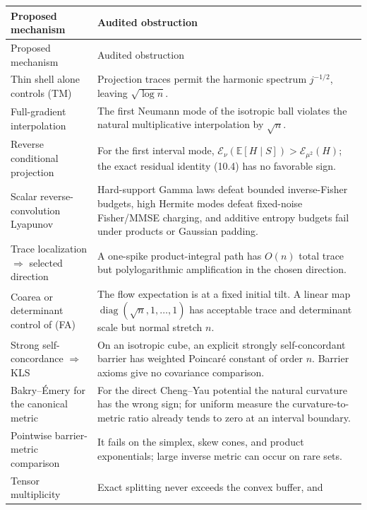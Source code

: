 \documentclass[11pt]{article}
\theoremstyle{definition}
\theoremstyle{remark}
\newcommand{\E}{\mathbb E}
\newcommand{\1}{\mathbf 1}
\begin{document}
\begin{longtable}{>{\raggedright\arraybackslash}p{}
                  >{\raggedright\arraybackslash}p{}}
\toprule
Proposed mechanism & Audited obstruction \\
\midrule
\endfirsthead
\toprule
Proposed mechanism & Audited obstruction \\
\midrule
\endhead
Thin shell alone controls (TM) & Projection traces permit the harmonic
spectrum \(j^{-1/2}\), leaving \(\sqrt{\log n}\). \\
\addlinespace
Full-gradient interpolation & The first Neumann mode of the isotropic ball
violates the natural multiplicative interpolation by \(\sqrt n\). \\
\addlinespace
Reverse conditional projection & For the first interval mode,
\(\mathcal E_\nu(\E[H\mid S])>\mathcal E_{\mu^2}(H)\); the exact residual
identity (10.4) has no favorable sign. \\
\addlinespace
Scalar reverse-convolution Lyapunov & Hard-support Gamma laws defeat
bounded inverse-Fisher budgets, high Hermite modes defeat fixed-noise
Fisher/MMSE charging, and additive entropy budgets fail under products or
Gaussian padding. \\
\addlinespace
Trace localization \(\Rightarrow\) selected direction & A one-spike
product-integral path has \(O(n)\) total trace but polylogarithmic
amplification in the chosen direction. \\
\addlinespace
Coarea or determinant control of (FA) & The flow expectation is at a fixed
initial tilt.  A linear map \(\operatorname{diag}(\sqrt n,1,\ldots,1)\)
has acceptable trace and determinant scale but normal stretch \(n\). \\
\addlinespace
Strong self-concordance \(\Rightarrow\) KLS & On an isotropic cube, an
explicit strongly self-concordant barrier has weighted Poincar\'e constant
of order \(n\).  Barrier axioms give no covariance comparison. \\
\addlinespace
Bakry--\'Emery for the canonical metric & For the direct Cheng--Yau
potential the natural curvature has the wrong sign; for uniform measure
the curvature-to-metric ratio already tends to zero at an interval
boundary. \\
\addlinespace
Pointwise barrier-metric comparison & It fails on the simplex, skew cones,
and product exponentials; large inverse metric can occur on rare sets. \\
\addlinespace
Tensor multiplicity & Exact splitting never exceeds the convex buffer, and

\end{longtable}
\end{document}
